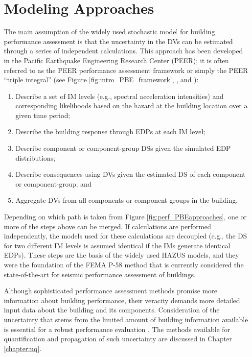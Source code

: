 \section{Modeling Approaches}
\label{sec:perf_bldg_methods}

The main assumption of the widely used stochastic model for building performance assessment is that the uncertainty in the DVs can be estimated through a series of independent calculations. This approach has been developed in the Pacific Earthquake Engineering Research Center (PEER); it is often referred to as the PEER performance assessment framework or simply the PEER ``triple integral'' (see Figure \ref{fig:intro_PBE_framework}, \cite{moehle2004framework}, and \cite{porter2001assemblybased}):

\begin{enumerate}
    \item Describe a set of IM levels (e.g., spectral acceleration intensities) and corresponding likelihoods based on the hazard at the building location over a given time period;
    \vspace{2mm}
    \item Describe the building response through EDPs at each IM level;
        \vspace{2mm}
    \item Describe component or component-group DSs given the simulated EDP distributions;
        \vspace{2mm}
    \item Describe consequences using DVs given the estimated DS of each component or component-group; and
        \vspace{2mm}
    \item Aggregate DVs from all components or component-groups in the building.
\end{enumerate}

Depending on which path is taken from Figure \ref{fig:perf_PBEapproaches}, one or more of the steps above can be merged. If calculations are performed independently, the models used for these calculations are decoupled (e.g., the DS for two different IM levels is assumed identical if the IMs generate identical EDPs). These steps are the basis of the widely used HAZUS models, and they were the foundation of the FEMA P-58 method that is currently considered the state-of-the-art for seismic performance assessment of buildings.

Although sophisticated performance assessment methods promise more information about building performance, their veracity demands more detailed input data about the building and its components. Consideration of the uncertainty that stems from the limited amount of building information available is essential for a robust performance evaluation \citep{bradley2013critical}. The methods available for quantification and propagation of such uncertainty are discussed in Chapter \ref{chapter:uq}.

